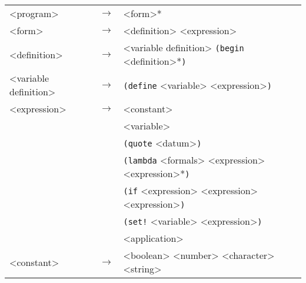   {\footnotesize
\begin{tabular}[H]{lcl}

\textless{}program\textgreater{} & \(\longrightarrow\) & \textless{}form\textgreater{}* \\

\textless{}form\textgreater{} & \(\longrightarrow\) & \textless{}definition\textgreater{} \textbar{} \textless{}expression\textgreater{}  \\

\textless{}definition\textgreater{} & \(\longrightarrow\) & \textless{}variable definition\textgreater{} \textbar{} \texttt{(begin} \textless{}definition\textgreater{}*\texttt{)}  \\

\textless{}variable definition\textgreater{} & \(\longrightarrow\) & \texttt{(define} \textless{}variable\textgreater{} \textless{}expression\textgreater{}\texttt{)}  \\

\textless{}expression\textgreater{} & \(\longrightarrow\) & \textless{}constant\textgreater{}  \\

       & \textbar{} & \textless{}variable\textgreater{}  \\

       & \textbar{} & \texttt{(quote} \textless{}datum\textgreater{}\texttt{)}  \\

       & \textbar{} & \texttt{(lambda} \textless{}formals\textgreater{} \textless{}expression\textgreater{} \textless{}expression\textgreater{}*\texttt{)}  \\

       & \textbar{} & \texttt{(if} \textless{}expression\textgreater{} \textless{}expression\textgreater{} \textless{}expression\textgreater{}\texttt{)}  \\

       & \textbar{} & \texttt{(set!} \textless{}variable\textgreater{} \textless{}expression\textgreater{}\texttt{)}  \\

       & \textbar{} & \textless{}application\textgreater{}  \\

\textless{}constant\textgreater{} & \(\longrightarrow\) & \textless{}boolean\textgreater{} \textbar{} \textless{}number\textgreater{} \textbar{} \textless{}character\textgreater{} \textbar{} \textless{}string\textgreater{}  \\


\end{tabular}}
